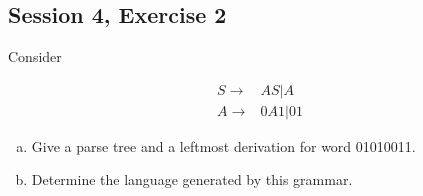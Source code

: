 \subsection{Session 4, Exercise 2}


Consider

\begin{align*}
S \rightarrow& AS|A\\
A \rightarrow& 0A1|01
\end{align*}

\begin{enumerate}[(a)]
\item Give a parse tree and a leftmost derivation for word 01010011.
\item Determine the language generated by this grammar.
\end{enumerate}

